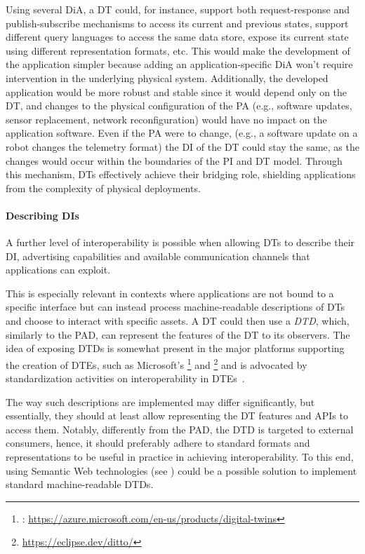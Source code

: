 Using several \ac{DiA}, a \ac{DT} could, for instance, support both request-response and publish-subscribe mechanisms to access its current and previous states, support different query languages to access the same data store, expose its current state using different representation formats, etc.
%
This would make the development of the application simpler because adding an application-specific \ac{DiA} won't require intervention in the underlying physical system. 
%
Additionally, the developed application would be more robust and stable since it would depend only on the \ac{DT}, and changes to the physical configuration of the \ac{PA} (e.g., software updates, sensor replacement, network reconfiguration) would have no impact on the application software.
%
Even if the \ac{PA} were to change, (e.g., a software update on a robot changes the telemetry format) the \ac{DI} of the \ac{DT} could stay the same, as the changes would occur within the boundaries of the \ac{PI} and \ac{DT} model.
%
Through this mechanism, \acp{DT} effectively achieve their bridging role, shielding applications from the complexity of physical deployments.

\paragraph{Describing \aclp{DI}}

A further level of interoperability is possible when allowing \acp{DT} to describe their \ac{DI}, advertising capabilities and available communication channels that applications can exploit.

This is especially relevant in contexts where applications are not bound to a specific interface but can instead process machine-readable descriptions of \acp{DT} and choose to interact with specific assets.
%
A \ac{DT} could then use a \emph{\ac{DTD}}, which, similarly to the \ac{PAD}, can represent the features of the \ac{DT} to its observers.
%
The idea of exposing \acp{DTD} is somewhat present in the major platforms supporting the creation of \acp{DTE}, such as 
Microsoft's \azureTwin{}\footnote{\azureTwin{}: \url{https://azure.microsoft.com/en-us/products/digital-twins}} and \ditto{}\footnote{\ditto{} \url{https://eclipse.dev/ditto/}} and is advocated by standardization activities on interoperability in \acp{DTE}~\cite{etsi-dt-comm-requirements-2024}.

The way such descriptions are implemented may differ significantly, but essentially, they should at least allow representing the \ac{DT}  features and APIs to access them.
%
Notably, differently from the \ac{PAD}, the \ac{DTD} is targeted to external consumers, hence, it should preferably adhere to standard formats and representations to be useful in practice in achieving interoperability.
%
To this end, using Semantic Web technologies (see ) could be a possible solution to implement standard machine-readable \acp{DTD}.

